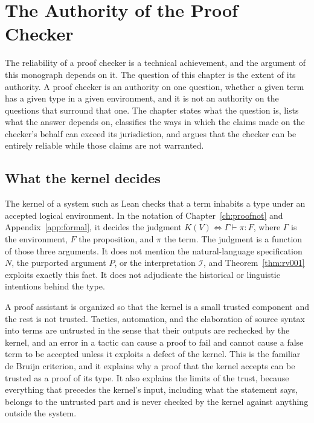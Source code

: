 \chapter{The Authority of the Proof Checker}
\label{ch:authority}

The reliability of a proof checker is a technical achievement, and the argument of this monograph depends on it. The question of this chapter is the extent of its authority. A proof checker is an authority on one question, whether a given term has a given type in a given environment, and it is not an authority on the questions that surround that one. The chapter states what the question is, lists what the answer depends on, classifies the ways in which the claims made on the checker's behalf can exceed its jurisdiction, and argues that the checker can be entirely reliable while those claims are not warranted.

\section{What the kernel decides}

The kernel of a system such as Lean checks that a term inhabits a type under an accepted logical environment. In the notation of Chapter~\ref{ch:proofnot} and Appendix~\ref{app:formal}, it decides the judgment $K(V) \iff \Gamma \vdash \pi : F$, where $\Gamma$ is the environment, $F$ the proposition, and $\pi$ the term. The judgment is a function of those three arguments. It does not mention the natural-language specification $N$, the purported argument $P$, or the interpretation $\mathcal{I}$, and Theorem~\ref{thm:rv001} exploits exactly this fact. It does not adjudicate the historical or linguistic intentions behind the type.

A proof assistant is organized so that the kernel is a small trusted component and the rest is not trusted. Tactics, automation, and the elaboration of source syntax into terms are untrusted in the sense that their outputs are rechecked by the kernel, and an error in a tactic can cause a proof to fail and cannot cause a false term to be accepted unless it exploits a defect of the kernel. This is the familiar de Bruijn criterion, and it explains why a proof that the kernel accepts can be trusted as a proof of its type. It also explains the limits of the trust, because everything that precedes the kernel's input, including what the statement says, belongs to the untrusted part and is never checked by the kernel against anything outside the system.

